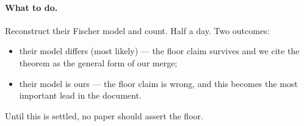 \paragraph{What to do.} Reconstruct their Fischer model and count. Half a day. Two outcomes:
\begin{itemize}
\item their model differs (most likely) --- the floor claim survives and we cite the theorem as
      the general form of our merge;
\item their model is ours --- the floor claim is wrong, and this becomes the most important lead in
      the document.
\end{itemize}

Until this is settled, no paper should assert the floor.
